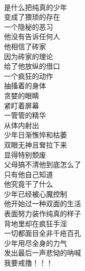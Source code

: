 \begin{poem}[少年的沉沦]
    \begin{multicols}{3}
        \begin{center}~\\
            是什么把纯真的少年 \\ 变成了猥琐的存在 \\ 一个隐秘的恶习 \\ 他没有告诉任何人 \\ 他相信了砖家 \\ 因为砖家的理论 \\ 给了他放纵的借口 \\ 一个疯狂的动作 \\ 抽搐着的身体 \\ 贪婪的眼睛 \\ 紧盯着屏幕 \\ 一管管的精华 \\ 从体内射出 \\ 少年日渐憔悴和枯萎 \\ 双眼无神且耷拉下来 \\ 显得特别颓废 \\ 父母搞不清他到底怎么了 \\ 只有他自己知道 \\ 他究竟干了什么 \\ 少年已经被心魔控制 \\ 他开始过一种双面的生活 \\ 表面努力装作纯真的样子 \\ 背地里却在疯狂手淫 \\ 一切都面目全非千疮百孔 \\ 少年用尽全身的力气 \\ 发出最后一声悲恸的呐喊 \\ 我要戒撸！！！
        \end{center}
    \end{multicols}
\end{poem}

